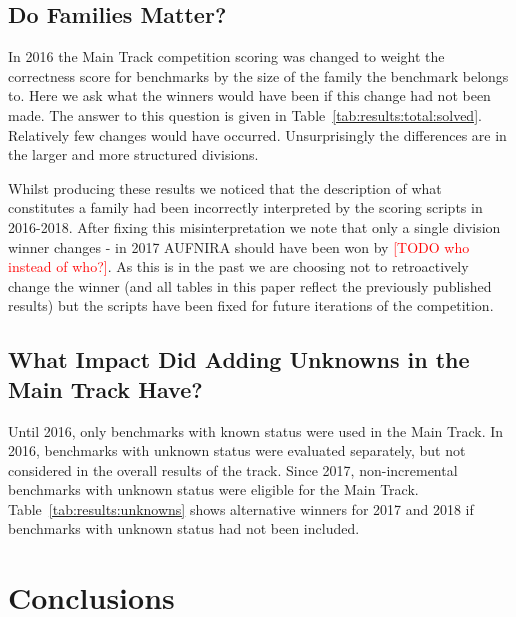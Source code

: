 \documentclass[dvipsnames,table,twoside,11pt]{article}
\newcommand{\rem}[1]{\textcolor{red}{[#1]}}
\newcommand{\todo}[1]{\rem{TODO #1}}
\newcommand{\maintrack}{Main Track\xspace}
\begin{document}


\subsection{Do Families Matter?}

In 2016 the \maintrack competition scoring was changed to weight the correctness score for benchmarks by the size of the family the benchmark belongs to. Here we ask what the winners would have been if this change had not been made. The answer to this question is given in Table~\ref{tab:results:total:solved}. Relatively few changes would have occurred. Unsurprisingly the differences are in the larger and more structured divisions.

Whilst producing these results we noticed that the description of what constitutes a family had been incorrectly interpreted by the scoring scripts in 2016-2018. After fixing this misinterpretation we note that only a single division winner changes - in 2017 AUFNIRA should have been won by 
\todo{who instead of who?}. As this is in the past we are choosing not to retroactively change the winner (and all tables in this paper reflect the previously published results) but the scripts have been fixed for future iterations of the competition.


\subsection{What Impact Did Adding Unknowns in the \maintrack Have?}

Until 2016, only benchmarks with known status were used in the \maintrack. In
2016, benchmarks with unknown status were evaluated separately, but not
considered in the overall results of the track.  Since 2017, non-incremental
benchmarks with unknown status were eligible for the \maintrack.
Table~\ref{tab:results:unknowns} shows alternative winners for 2017 and 2018 if
benchmarks with unknown status had not been included.





\section{Conclusions}
\label{sec:conclusions}
\end{document}
